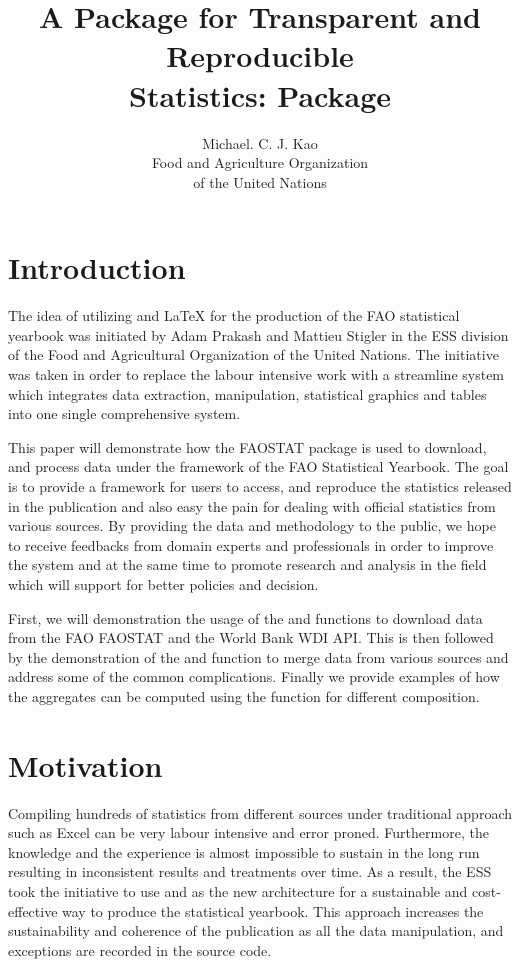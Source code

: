 \documentclass[nojss]{jss}\usepackage{graphicx, color}
\author{Michael. C. J. Kao\\ Food and Agriculture Organization \\of
  the United Nations}
\title{A Package for Transparent and Reproducible\\ Statistics: Package \pkg{FAOSTAT}}
\begin{document}



\section{Introduction}
The idea of utilizing  and \LaTeX{} for the production of
the FAO statistical yearbook was initiated by Adam Prakash and Mattieu
Stigler in the ESS division of the Food and Agricultural Organization
of the United Nations. The initiative was taken in order to replace
the labour intensive work with a streamline system which integrates
data extraction, manipulation, statistical graphics and tables into
one single comprehensive system.

This paper will demonstrate how the FAOSTAT package is used to
download, and process data under the framework of the FAO Statistical
Yearbook. The goal is to provide a framework for users to access, and
reproduce the statistics released in the publication and also easy the
pain for dealing with official statistics from various sources.  By
providing the data and methodology to the public, we hope to receive
feedbacks from domain experts and professionals in order to improve
the system and at the same time to promote research and analysis in
the field which will support for better policies and decision.


First, we will demonstration the usage of the  and
 functions to download data from the FAO FAOSTAT and
the World Bank WDI API. This is then followed by the demonstration of
the  and  function to merge
data from various sources and address some of the common
complications. Finally we provide examples of how the aggregates can
be computed using the function for different
composition.

\section{Motivation}
Compiling hundreds of statistics from different sources under
traditional approach such as Excel can be very labour intensive and
error proned. Furthermore, the knowledge and the experience is almost
impossible to sustain in the long run resulting in inconsistent
results and treatments over time. As a result, the ESS took the
initiative to use  and \proglang{\LaTeX} as the new
architecture for a sustainable and cost-effective way to produce the
statistical yearbook. This approach increases the sustainability and
coherence of the publication as all the data manipulation, and
exceptions are recorded in the source code.
\end{document}
